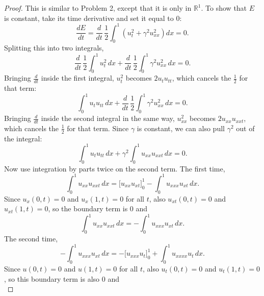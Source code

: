 \documentclass[11pt]{article}
\newcommand{\R}{\mathbb{R}}
\theoremstyle{definition}
\begin{document}
\begin{proof}
This is similar to Problem 2, except that it is only in $\R^1$. To show that
$E$ is constant, take its time derivative and set it equal to 0:
\begin{equation} \label{eq:beam-dEdt}
\frac{dE}{dt} = \frac{d}{dt} \, \frac{1}{2} \int_0^1
  \left( u_t^2 + \gamma^2 u_{xx}^2 \right) dx = 0.
\end{equation}
Splitting this into two integrals,
\begin{equation} \label{eq:beam-dEdt-split}
\frac{d}{dt} \, \frac{1}{2} \int_0^1 u_t^2 \, dx
  + \frac{d}{dt} \, \frac{1}{2} \int_0^1 \gamma^2 u_{xx}^2 \, dx = 0.
\end{equation}
Bringing $\frac{d}{dt}$ inside the first integral, $u_t^2$ becomes
$2 u_t u_{tt}$, which cancels the $\frac{1}{2}$ for that term:
\begin{equation} \label{eq:beam-dEdt-first}
\int_0^1 u_t u_{tt} \, dx
  + \frac{d}{dt} \, \frac{1}{2} \int_0^1 \gamma^2 u_{xx}^2 \, dx = 0.
\end{equation}
Bringing $\frac{d}{dt}$ inside the second integral in the same way,
$u_{xx}^2$ becomes $2 u_{xx} u_{xxt}$, which cancels the $\frac{1}{2}$ for
that term. Since $\gamma$ is constant, we can also pull $\gamma^2$ out of the
integral:
\begin{equation} \label{eq:beam-dEdt-second}
\int_0^1 u_t u_{tt} \, dx
  + \gamma^2 \int_0^1 u_{xx} u_{xxt} \, dx = 0.
\end{equation}
Now use integration by parts twice on the second term. The first time,
\begin{equation} \label{eq:beam-ibp1}
\int_0^1 u_{xx} u_{xxt} \, dx
  = \Big[ u_{xx} u_{xt} \Big]_0^1 - \int_0^1 u_{xxx} u_{xt} \, dx.
\end{equation}
Since $u_x(0,t) = 0$ and $u_x(1,t) = 0$ for all $t$, also $u_{xt}(0,t) = 0$
and $u_{xt}(1,t) = 0$, so the boundary term is 0 and
\begin{equation} \label{eq:beam-ibp1-result}
\int_0^1 u_{xx} u_{xxt} \, dx = -\int_0^1 u_{xxx} u_{xt} \, dx.
\end{equation}
The second time,
\begin{equation} \label{eq:beam-ibp2}
-\int_0^1 u_{xxx} u_{xt} \, dx
  = -\Big[ u_{xxx} u_t \Big]_0^1 + \int_0^1 u_{xxxx} u_t \, dx.
\end{equation}
Since $u(0,t) = 0$ and $u(1,t) = 0$ for all $t$, also $u_t(0,t) = 0$ and
$u_t(1,t) = 0$, so this boundary term is also 0 and
\begin{equation} \label{eq:beam-ibp2-result}

\end{equation}
\end{proof}
\end{document}

